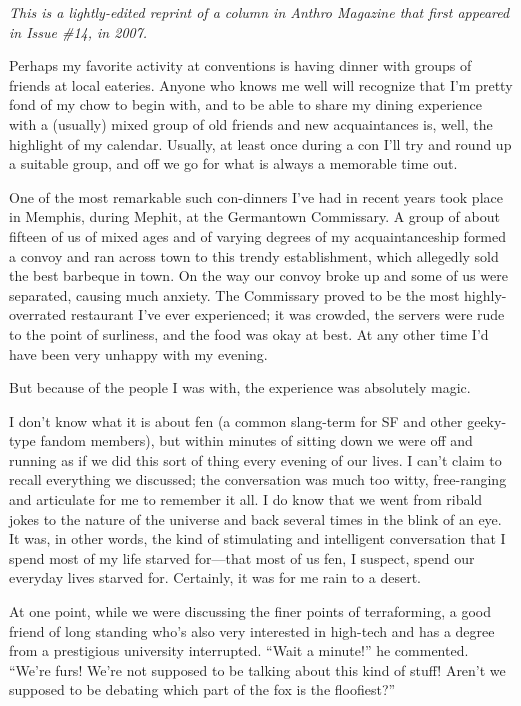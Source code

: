 
\textit{This is a lightly-edited reprint of a column in Anthro Magazine that first appeared in Issue \#14, in 2007.}

Perhaps my favorite activity at conventions is having dinner with groups of friends at local eateries. Anyone who knows me well will recognize that I'm pretty fond of my chow to begin with, and to be able to share my dining experience with a (usually) mixed group of old friends and new acquaintances is, well, the highlight of my calendar. Usually, at least once during a con I'll try and round up a suitable group, and off we go for what is always a memorable time out.

One of the most remarkable such con-dinners I've had in recent years took place in Memphis, during Mephit, at the Germantown Commissary. A group of about fifteen of us of mixed ages and of varying degrees of my acquaintanceship formed a convoy and ran across town to this trendy establishment, which allegedly sold the best barbeque in town. On the way our convoy broke up and some of us were separated, causing much anxiety. The Commissary proved to be the most highly-overrated restaurant I've ever experienced; it was crowded, the servers were rude to the point of surliness, and the food was okay at best. At any other time I'd have been very unhappy with my evening.

But because of the people I was with, the experience was absolutely magic.

I don't know what it is about fen (a common slang-term for SF and other geeky-type fandom members), but within minutes of sitting down we were off and running as if we did this sort of thing every evening of our lives. I can't claim to recall everything we discussed; the conversation was much too witty, free-ranging and articulate for me to remember it all. I do know that we went from ribald jokes to the nature of the universe and back several times in the blink of an eye. It was, in other words, the kind of stimulating and intelligent conversation that I spend most of my life starved for—that most of us fen, I suspect, spend our everyday lives starved for. Certainly, it was for me rain to a desert.

At one point, while we were discussing the finer points of terraforming, a good friend of long standing who's also very interested in high-tech and has a degree from a prestigious university interrupted. ``Wait a minute!'' he commented. ``We're furs! We're not supposed to be talking about this kind of stuff! Aren't we supposed to be debating which part of the fox is the floofiest?''

